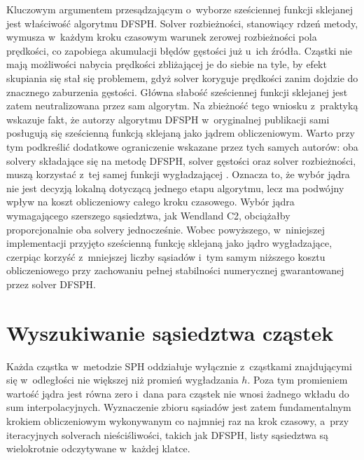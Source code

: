 Kluczowym argumentem przesądzającym o~wyborze sześciennej funkcji sklejanej jest
właściwość algorytmu DFSPH. Solver rozbieżności, stanowiący rdzeń metody, wymusza
w~każdym kroku czasowym warunek zerowej rozbieżności pola prędkości, co zapobiega
akumulacji błędów gęstości już u~ich źródła. Cząstki nie mają możliwości nabycia
prędkości zbliżającej je do siebie na tyle, by efekt skupiania się stał się problemem,
gdyż solver koryguje prędkości zanim dojdzie do znacznego zaburzenia gęstości.
Główna słabość sześciennej funkcji sklejanej jest zatem neutralizowana przez sam
algorytm. Na zbieżność tego wniosku z~praktyką wskazuje fakt, że autorzy algorytmu
DFSPH w~oryginalnej publikacji \cite{bender2015divergence} sami posługują się sześcienną
funkcją sklejaną jako jądrem obliczeniowym. Warto przy tym podkreślić dodatkowe
ograniczenie wskazane przez tych samych autorów: oba solvery składające się na metodę
DFSPH, solver gęstości oraz solver rozbieżności, muszą korzystać z~tej samej funkcji
wygładzającej \cite{bender2015divergence}. Oznacza to, że wybór jądra nie jest decyzją
lokalną dotyczącą jednego etapu algorytmu, lecz ma podwójny wpływ na koszt obliczeniowy
całego kroku czasowego. Wybór jądra wymagającego szerszego sąsiedztwa, jak Wendland C2,
obciążałby proporcjonalnie oba solvery jednocześnie. Wobec powyższego, w~niniejszej
implementacji przyjęto sześcienną funkcję sklejaną jako jądro wygładzające, czerpiąc
korzyść z~mniejszej liczby sąsiadów i~tym samym niższego kosztu obliczeniowego przy
zachowaniu pełnej stabilności numerycznej gwarantowanej przez solver DFSPH.


\section{Wyszukiwanie sąsiedztwa cząstek}
\label{sec:neighbor_search_theory}

Każda cząstka w~metodzie SPH oddziałuje wyłącznie z~cząstkami znajdującymi się
w~odległości nie większej niż promień wygładzania $h$. Poza tym promieniem wartość
jądra jest równa zero i~dana para cząstek nie wnosi żadnego wkładu do sum
interpolacyjnych. Wyznaczenie zbioru sąsiadów jest zatem fundamentalnym krokiem
obliczeniowym wykonywanym co najmniej raz na krok czasowy, a~przy iteracyjnych
solverach nieściśliwości, takich jak DFSPH, listy sąsiedztwa są wielokrotnie
odczytywane w~każdej klatce.

